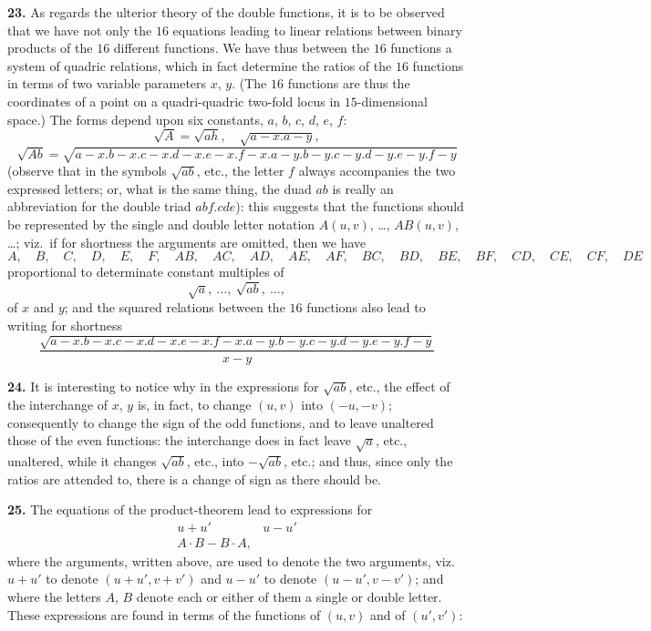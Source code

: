 \documentclass[12pt,a4paper]{article}
\theoremstyle{definition}
\begin{document}
\vspace{0.5em}

\noindent\textbf{23.}\quad
As regards the ulterior theory of the double functions, it is to be observed that we have not only the $16$ equations leading to linear relations between binary products of the $16$ different functions. We have thus between the $16$ functions a system of quadric relations, which in fact determine the ratios of the $16$ functions in terms of two variable parameters $x$, $y$. (The $16$ functions are thus the coordinates of a point on a quadri-quadric two-fold locus in $15$-dimensional space.) The forms depend upon six constants, $a$, $b$, $c$, $d$, $e$, $f$:
\[
\sqrt{A} = \sqrt{ah}, \quad \sqrt{a - x . a - y},
\]
\[
\sqrt{Ab} = \sqrt{a - x . b - x . c - x . d - x . e - x . f - x . a - y . b - y . c - y . d - y . e - y . f - y}
\]
(observe that in the symbols $\sqrt{ab}$, etc., the letter $f$ always accompanies the two expressed letters; or, what is the same thing, the duad $ab$ is really an abbreviation for the double triad $abf.cde$): this suggests that the functions should be represented by the single and double letter notation $A(u, v)$, \dots, $AB(u, v)$, \dots; viz.\ if for shortness the arguments are omitted, then we have
\[
A,\quad B,\quad C,\quad D,\quad E,\quad F,\quad AB,\quad AC,\quad AD,\quad AE,\quad AF,\quad BC,\quad BD,\quad BE,\quad BF,\quad CD,\quad CE,\quad CF,\quad DE
\]
proportional to determinate constant multiples of
\[
\sqrt{a},\ \dots,\ \sqrt{ab},\ \dots,
\]
of $x$ and $y$; and the squared relations between the $16$ functions also lead to writing for shortness
\[
\frac{\sqrt{a - x . b - x . c - x . d - x . e - x . f - x . a - y . b - y . c - y . d - y . e - y . f - y}}{x - y}
\]

\noindent\textbf{24.}\quad
It is interesting to notice why in the expressions for $\sqrt{ab}$, etc., the effect of the interchange of $x$, $y$ is, in fact, to change $(u, v)$ into $(-u, -v)$; consequently to change the sign of the odd functions, and to leave unaltered those of the even functions: the interchange does in fact leave $\sqrt{a}$, etc., unaltered, while it changes $\sqrt{ab}$, etc., into $-\sqrt{ab}$, etc.; and thus, since only the ratios are attended to, there is a change of sign as there should be.

\noindent\textbf{25.}\quad
The equations of the product-theorem lead to expressions for
\[
\begin{matrix} u + u' & u - u' \\ A \cdot B - B \cdot A, \end{matrix}
\]
where the arguments, written above, are used to denote the two arguments, viz.\ $u + u'$ to denote $(u + u', v + v')$ and $u - u'$ to denote $(u - u', v - v')$; and where the letters $A$, $B$ denote each or either of them a single or double letter. These expressions are found in terms of the functions of $(u, v)$ and of $(u', v')$:
\end{document}

